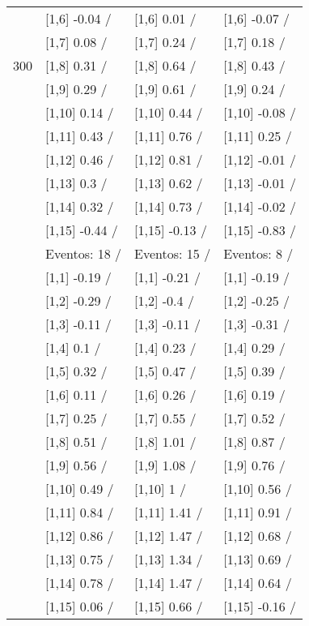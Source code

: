 \begin{table}
\begin{tabular}[t]{llll}
 & {}[1,6] -0.04  / & {}[1,6] 0.01  / & {}[1,6] -0.07  /\\
 & {}[1,7] 0.08  / & {}[1,7] 0.24  / & {}[1,7] 0.18  /\\
300 & {}[1,8] 0.31  / & {}[1,8] 0.64  / & {}[1,8] 0.43  /\\
\addlinespace
 & {}[1,9] 0.29  / & {}[1,9] 0.61  / & {}[1,9] 0.24  /\\
 & {}[1,10] 0.14  / & {}[1,10] 0.44  / & {}[1,10] -0.08  /\\
 & {}[1,11] 0.43  / & {}[1,11] 0.76  / & {}[1,11] 0.25  /\\
 & {}[1,12] 0.46  / & {}[1,12] 0.81  / & {}[1,12] -0.01  /\\
 & {}[1,13] 0.3  / & {}[1,13] 0.62  / & {}[1,13] -0.01  /\\
\addlinespace
 & {}[1,14] 0.32  / & {}[1,14] 0.73  / & {}[1,14] -0.02  /\\
 & {}[1,15] -0.44  / & {}[1,15] -0.13  / & {}[1,15] -0.83  /\\
 & Eventos:  18 / & Eventos:  15 / & Eventos:  8 /\\
 & {}[1,1] -0.19  / & {}[1,1] -0.21  / & {}[1,1] -0.19  /\\
 & {}[1,2] -0.29  / & {}[1,2] -0.4  / & {}[1,2] -0.25  /\\
\addlinespace
 & {}[1,3] -0.11  / & {}[1,3] -0.11  / & {}[1,3] -0.31  /\\
 & {}[1,4] 0.1  / & {}[1,4] 0.23  / & {}[1,4] 0.29  /\\
 & {}[1,5] 0.32  / & {}[1,5] 0.47  / & {}[1,5] 0.39  /\\
 & {}[1,6] 0.11  / & {}[1,6] 0.26  / & {}[1,6] 0.19  /\\
 & {}[1,7] 0.25  / & {}[1,7] 0.55  / & {}[1,7] 0.52  /\\
\addlinespace
500 & {}[1,8] 0.51  / & {}[1,8] 1.01  / & {}[1,8] 0.87  /\\
 & {}[1,9] 0.56  / & {}[1,9] 1.08  / & {}[1,9] 0.76  /\\
 & {}[1,10] 0.49  / & {}[1,10] 1  / & {}[1,10] 0.56  /\\
 & {}[1,11] 0.84  / & {}[1,11] 1.41  / & {}[1,11] 0.91  /\\
 & {}[1,12] 0.86  / & {}[1,12] 1.47  / & {}[1,12] 0.68  /\\
\addlinespace
 & {}[1,13] 0.75  / & {}[1,13] 1.34  / & {}[1,13] 0.69  /\\
 & {}[1,14] 0.78  / & {}[1,14] 1.47  / & {}[1,14] 0.64  /\\
 & {}[1,15] 0.06  / & {}[1,15] 0.66  / & {}[1,15] -0.16  /\\
\bottomrule
\end{tabular}
\end{table}
